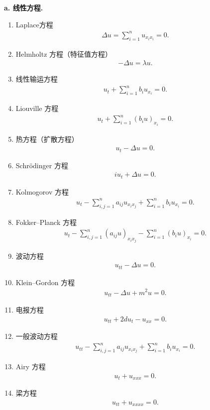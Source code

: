 \documentclass[../../main.tex]{subfiles}
\begin{document}
\textbf{a. 线性方程.}
\begin{enumerate}
\item Laplace方程
\begin{align*}
\Delta u=\sum_{i=1}^n u_{x_i x_i}=0.
\end{align*}
\item Helmholtz 方程（特征值方程）
\begin{align*}
-\Delta u=\lambda u.
\end{align*}
\item 线性输运方程
\begin{align*}
u_t+\sum_{i=1}^n b_i u_{x_i}=0.
\end{align*}
\item Liouville 方程
\begin{align*}
u_t+\sum_{i=1}^n (b_i u)_{x_i}=0.
\end{align*}
\item 热方程（扩散方程）
\begin{align*}
u_t-\Delta u=0.
\end{align*}
\item Schrödinger 方程
\begin{align*}
i u_t+\Delta u=0.
\end{align*}
\item Kolmogorov 方程
\begin{align*}
u_t-\sum_{i,j=1}^n a_{ij} u_{x_i x_j}+\sum_{i=1}^n b_i u_{x_i}=0.
\end{align*}
\item Fokker--Planck 方程
\begin{align*}
u_t-\sum_{i,j=1}^n (a_{ij}u)_{x_i x_j}-\sum_{i=1}^n (b_i u)_{x_i}=0.
\end{align*}
\item 波动方程
\begin{align*}
u_{tt}-\Delta u=0.
\end{align*}
\item Klein--Gordon 方程
\begin{align*}
u_{tt}-\Delta u+m^2 u=0.
\end{align*}
\item 电报方程
\begin{align*}
u_{tt}+2d u_t-u_{xx}=0.
\end{align*}
\item 一般波动方程
\begin{align*}
u_{tt}-\sum_{i,j=1}^n a_{ij} u_{x_i x_j}+\sum_{i=1}^n b_i u_{x_i}=0.
\end{align*}
\item Airy 方程
\begin{align*}
u_t+u_{xxx}=0.
\end{align*}
\item 梁方程
\begin{align*}
u_{tt}+u_{xxxx}=0.
\end{align*}
\end{enumerate}
\end{document}
